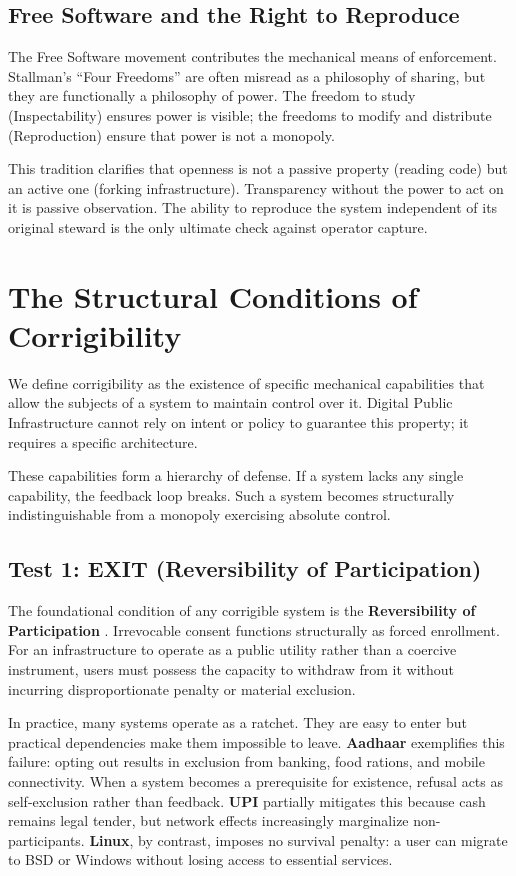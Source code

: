 \documentclass{article}
\begin{document}
\subsection{Free Software and the Right to Reproduce}

The Free Software movement \citep{stallman2002} contributes the mechanical means of enforcement. Stallman's ``Four Freedoms'' are often misread as a philosophy of sharing, but they are functionally a philosophy of power. The freedom to study (Inspectability) ensures power is visible; the freedoms to modify and distribute (Reproduction) ensure that power is not a monopoly.

This tradition clarifies that openness is not a passive property (reading code) but an active one (forking infrastructure). Transparency without the power to act on it is passive observation. The ability to reproduce the system independent of its original steward is the only ultimate check against operator capture.

\section{The Structural Conditions of Corrigibility}

We define corrigibility as the existence of specific mechanical capabilities that allow the subjects of a system to maintain control over it. Digital Public Infrastructure cannot rely on intent or policy to guarantee this property; it requires a specific architecture.

These capabilities form a hierarchy of defense. If a system lacks any single capability, the feedback loop breaks. Such a system becomes structurally indistinguishable from a monopoly exercising absolute control.

\subsection{Test 1: EXIT (Reversibility of Participation)}

The foundational condition of any corrigible system is the \textbf{Reversibility of Participation} \citep{hirschman1970}. Irrevocable consent functions structurally as forced enrollment. For an infrastructure to operate as a public utility rather than a coercive instrument, users must possess the capacity to withdraw from it without incurring disproportionate penalty or material exclusion.

In practice, many systems operate as a ratchet. They are easy to enter but practical dependencies make them impossible to leave. \textbf{Aadhaar} exemplifies this failure: opting out results in exclusion from banking, food rations, and mobile connectivity. When a system becomes a prerequisite for existence, refusal acts as self-exclusion rather than feedback. \textbf{UPI} partially mitigates this because cash remains legal tender, but network effects increasingly marginalize non-participants. \textbf{Linux}, by contrast, imposes no survival penalty: a user can migrate to BSD or Windows without losing access to essential services.
\end{document}
